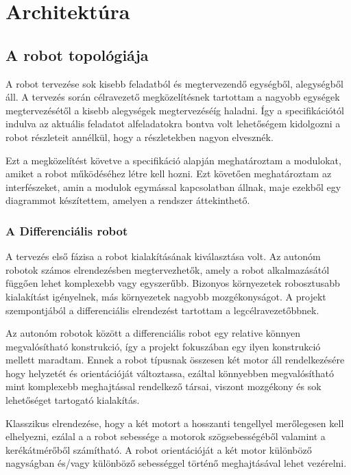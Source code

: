 \chapter{Architektúra}

\section{A robot topológiája}

A robot tervezése sok kisebb feladatból és megtervezendő egységből, alegységből
áll. A tervezés során célravezető megközelítésnek tartottam a nagyobb egységek
megtervezésétől a kisebb alegységek megtervezéséíg haladni. Így a specifikációtól
indulva az aktuális feladatot alfeladatokra bontva volt lehetőségem kidolgozni a
robot részleteit annélkül, hogy a részletekben nagyon elvesznék.

Ezt a megközelítést követve a specifikáció alapján meghatároztam a modulokat,
amiket a robot működéséhez létre kell hozni. Ezt követően meghatároztam az
interfészeket, amin a modulok egymással kapcsolatban állnak, maje ezekből egy diagrammot
készítettem, amelyen a rendszer áttekinthető. 


\subsection{A Differenciális robot}

A tervezés első fázisa a robot kialakításának kiválasztása volt. Az autonóm
robotok számos elrendezésben megtervezhetők, amely a robot alkalmazásától függően
lehet komplexebb vagy egyszerűbb. Bizonyos környezetek robosztusabb kialakítást
igényelnek, más környezetek nagyobb mozgékonyságot. A projekt szempontjából a
differenciális elrendezést tartottam a legcélravezetőbbnek.

Az autonóm robotok között a differenciális robot egy relative könnyen
megvalósítható konstrukció, így a projekt fokuszában egy ilyen konstrukció
mellett maradtam. Ennek a robot típusnak összesen két motor áll rendelkezésére
hogy helyzetét és orientációját változtassa, ezáltal könnyebben megvalósítható
mint komplexebb meghajtással rendelkező társai, viszont mozgékony és sok
lehetőséget tartogató kialakítás.


Klasszikus elrendezése, hogy a két motort a hosszanti tengellyel merőlegesen kell
elhelyezni, ezálal a a robot sebessége a motorok szögsebességéből valamint a
kerékátmérőből számítható. A robot orientációját a két motor különböző nagyságban
és/vagy különböző sebességgel történő meghajtásával lehet vezérelni.


